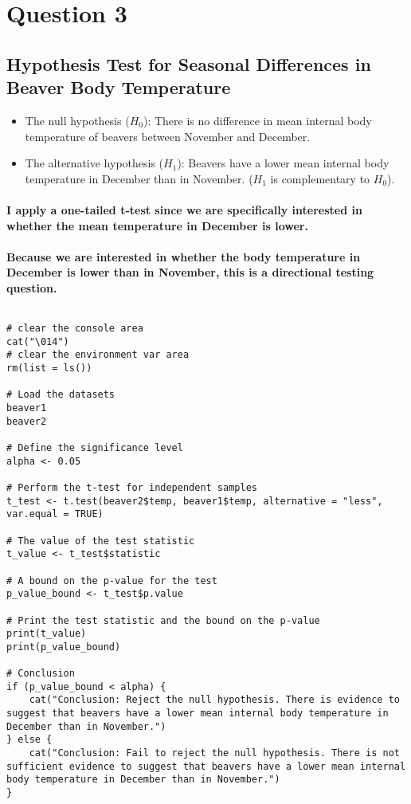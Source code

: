 \section{Question 3}
% 
% 
% 
% 
% 
% 
% 
% 
% 
\subsection{Hypothesis Test for Seasonal Differences in Beaver Body Temperature}
% 
% 
% 
\begin{itemize}
    \item The null hypothesis ($H_0$): There is no difference in mean internal body temperature of beavers between November and December.
    \item The alternative hypothesis ($H_1$): Beavers have a lower mean internal body temperature in December than in November. ($H_1$ is complementary to $H_0$).
\end{itemize}
% 
\paragraph{I apply a one-tailed t-test since we are specifically interested in whether the mean temperature in December is lower.}
\paragraph{Because we are interested in whether the body temperature in December is lower than in November, this is a directional testing question.}
% 
% 
% 
$$$$
% 
\begin{lstlisting}[style=rstyle]
# clear the console area
cat("\014")
# clear the environment var area
rm(list = ls())

# Load the datasets
beaver1
beaver2

# Define the significance level
alpha <- 0.05

# Perform the t-test for independent samples
t_test <- t.test(beaver2$temp, beaver1$temp, alternative = "less", var.equal = TRUE)

# The value of the test statistic
t_value <- t_test$statistic

# A bound on the p-value for the test
p_value_bound <- t_test$p.value

# Print the test statistic and the bound on the p-value
print(t_value)
print(p_value_bound)

# Conclusion
if (p_value_bound < alpha) {
    cat("Conclusion: Reject the null hypothesis. There is evidence to suggest that beavers have a lower mean internal body temperature in December than in November.")
} else {
    cat("Conclusion: Fail to reject the null hypothesis. There is not sufficient evidence to suggest that beavers have a lower mean internal body temperature in December than in November.")
}

\end{lstlisting}
% 
% 
